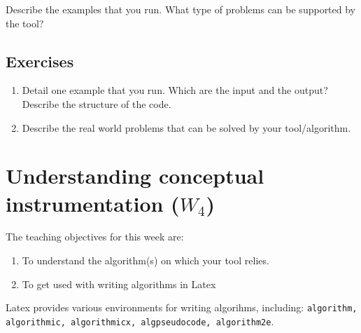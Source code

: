 \documentclass[a4paper,12pt]{report}
\begin{document}
\vspace{0.5cm}

\colorbox{blue!20}{}


Describe the examples that you run. 
What type of problems can be supported by the tool?
 
 \section{Exercises}
\begin{enumerate}
 \item Detail one example that you run. Which are the input and the output? 
 Describe the structure of the code. 
 \item Describe the real world problems that can be solved by your tool/algorithm.
\end{enumerate}

\vspace{0.5cm}

\vspace{0.5cm}

 
\chapter{Understanding conceptual instrumentation ($W_4$)}
\label{ch:tool}


The teaching objectives for this week are:
\begin{enumerate}
 \item To understand the algorithm(s) on which your tool relies.
\item To get used with writing algorithms in Latex
\end{enumerate}

Latex provides various environments for writing algorihms, including: 
\texttt{algorithm, algorithmic, algorithmicx, algpseudocode, algorithm2e}.
\end{document}
